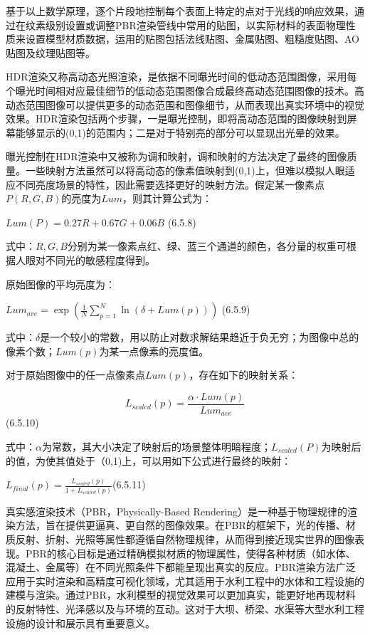 基于以上数学原理，逐个片段地控制每个表面上特定的点对于光线的响应效果，通过在纹素级别设置或调整PBR渲染管线中常用的贴图，以实际材料的表面物理性质来设置模型材质数据，运用的贴图包括法线贴图、金属贴图、粗糙度贴图、AO贴图及纹理贴图等。

HDR渲染又称高动态光照渲染，是依据不同曝光时间的低动态范围图像，采用每个曝光时间相对应最佳细节的低动态范围图像合成最终高动态范围图像的技术。高动态范围图像可以提供更多的动态范围和图像细节，从而表现出真实环境中的视觉效果。HDR渲染包括两个步骤，一是曝光控制，即将高动态范围的图像映射到屏幕能够显示的(0,1)的范围内；二是对于特别亮的部分可以显现出光晕的效果。

曝光控制在HDR渲染中又被称为调和映射，调和映射的方法决定了最终的图像质量。一些映射方法虽然可以将高动态的像素值映射到(0,1)上，但难以模拟人眼适应不同亮度场景的特性，因此需要选择更好的映射方法。假定某一像素点\(P(R,G,B)\)的亮度为\(Lum\)，则其计算公式为：

\(Lum\left( P \right) = 0.27R + 0.67G + 0.06B\) (6.5.8)

式中：\(R,G,B\)分别为某一像素点红、绿、蓝三个通道的颜色，各分量的权重可根据人眼对不同光的敏感程度得到。

原始图像的平均亮度为：

\(Lu{m_{ave}} = \exp \left( {\frac{1}{N}\sum\limits_{p = 1}^N {\ln \left( {\delta + Lum\left( p \right)} \right)} } \right)\) (6.5.9)

式中：\(\delta\)是一个较小的常数，用以防止对数求解结果趋近于负无穷；为图像中总的像素个数；\(Lum(p)\)为某一点像素的亮度值。

对于原始图像中的任一点像素点\(Lum(p)\)，存在如下的映射关系：

\[{L_{scaled}}\left( p \right) = \frac{{\alpha  \cdot Lum\left( p \right)}}{{Lu{m_{ave}}}}\](6.5.10)

式中：\(\alpha\)为常数，其大小决定了映射后的场景整体明暗程度；\(L_{scaled}(P)\)为映射后的值，为使其值处于（0,1)上，可以用如下公式进行最终的映射：

\({L_{final}}\left( p \right) = \frac{{{L_{scaled}}\left( p \right)}}{{1 + {L_{scaled}}\left( p \right)}}\)(6.5.11)

真实感渲染技术（PBR，Physically-Based Rendering）是一种基于物理规律的渲染方法，旨在提供更逼真、更自然的图像效果。在PBR的框架下，光的传播、材质反射、折射、光照等属性都遵循自然物理规律，从而得到接近现实世界的图像表现。PBR的核心目标是通过精确模拟材质的物理属性，使得各种材质（如水体、混凝土、金属等）在不同光照条件下都能呈现出真实的反应。PBR渲染方法广泛应用于实时渲染和高精度可视化领域，尤其适用于水利工程中的水体和工程设施的建模与渲染。通过PBR，水利模型的视觉效果可以更加真实，能更好地再现材料的反射特性、光泽感以及与环境的互动。这对于大坝、桥梁、水渠等大型水利工程设施的设计和展示具有重要意义。

